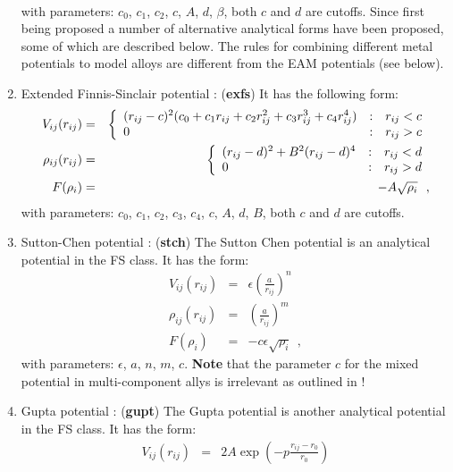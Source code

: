 \begin{enumerate}
\begin{eqnarray}
\end{eqnarray}
with parameters: $c_{0}$, $c_{1}$, $c_{2}$, $c$, $A$, $d$, $\beta$,
both $c$ and $d$ are cutoffs.  Since first being proposed a number of
alternative analytical forms have been proposed, some of which are
described below.  The rules for combining different metal potentials to
model alloys are different from the EAM potentials (see below).
\item Extended Finnis-Sinclair potential \cite{dai-06a}:  ({\bf exfs})
It has the following form:
\begin{eqnarray}
V_{ij}(r_{ij}) &=& \left\{ \begin{array} {l@{\quad:\quad}l}
(r_{ij}-c)^{2} (c_{0}+c_{1}r_{ij}+c_{2}r_{ij}^{2}+c_{3}r_{ij}^{3}+c_{4}r_{ij}^{4}) & r_{ij} < c \\
0 & r_{ij} > c
\end{array} \right. \nonumber \\
\rho_{ij}(r_{ij}) &=& \left\{ \begin{array} {l@{\quad:\quad}l}
(r_{ij}-d)^{2} + B^{2} (r_{ij}-d)^{4} & r_{ij} < d \\
0 & r_{ij} > d
\end{array} \right. \\
F(\rho_{i}) &=& -A \sqrt{\rho_{i}}~~, \nonumber
\end{eqnarray}
with parameters: $c_{0}$, $c_{1}$, $c_{2}$, $c_{3}$, $c_{4}$, $c$, $A$, $d$, $B$,
both $c$ and $d$ are cutoffs.
\item Sutton-Chen potential \cite{sutton-90a,sutton-91a,todd-93a}:
({\bf stch})
The Sutton Chen potential is an analytical potential in the FS
class.  It has the form:
\begin{eqnarray}
V_{ij}(r_{ij}) &=& \epsilon \left( \frac{a}{r_{ij}} \right)^{n} \nonumber \\
\rho_{ij}(r_{ij}) &=& \left( \frac{a}{r_{ij}} \right)^{m} \\
F(\rho_{i}) &=& -c \epsilon \sqrt{\rho_{i}}~~, \nonumber
\end{eqnarray}
with parameters: $\epsilon$, $a$, $n$, $m$, $c$.  {\bf Note} that
the parameter $c$ for the mixed potential in multi-component allys
is irrelevant as outlined in \cite{sutton-91a}!
\item Gupta potential \cite{cleri-93a}:  ({\bf gupt})
The Gupta potential is another analytical potential in the FS
class.  It has the form:
\begin{eqnarray}
V_{ij}(r_{ij}) &=& 2 A \exp \left(-p \frac{r_{ij}-r_{0}}{r_{0}}\right) \nonumber \\

\end{eqnarray}
\end{enumerate}
